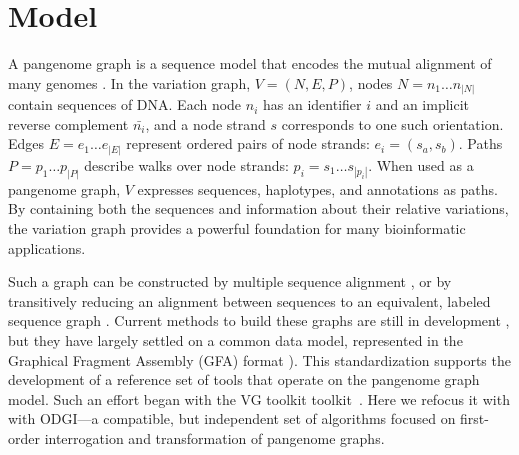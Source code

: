 \documentclass{bioinfo}
\newcommand{\red}[1]{{\textcolor{Red}{#1}}}
\newcommand{\FIXME}[1]{\red{[FIXME: #1]}}
\begin{document}

\section{Model}

A pangenome graph is a sequence model that encodes the mutual alignment of many genomes \citep{Garrison_2019_thesis,Eizenga_2020}.
In the variation graph, $V = (N, E, P)$, nodes $N = n_1\ldots n_{|N|}$ contain sequences of DNA.
Each node $n_i$ has an identifier $i$ and an implicit reverse complement $\bar{n_i}$, and a node strand $s$ corresponds to one such orientation.
Edges $E = e_1\ldots e_{|E|}$ represent ordered pairs of node strands: $e_i = ( s_a, s_b )$.
Paths $P = p_1\ldots p_{|P|}$ describe walks over node strands: $p_i = s_1 \ldots s_{|p_i|}$.
When used as a pangenome graph, $V$ expresses sequences, haplotypes, and annotations as paths.
By containing both the sequences and information about their relative variations, the variation graph provides a powerful foundation for many bioinformatic applications.

Such a graph can be constructed by multiple sequence alignment \citep{Lee_2002,Grasso_2004}, or by transitively reducing an alignment between sequences to an equivalent, labeled sequence graph \citep{Kehr_2014,Garrison_2019_thesis}.
Current methods to build these graphs are still in development \citep{Li:2020,Armstrong:2020,pggb}, but they have largely settled on a common data model, represented in the Graphical Fragment Assembly (GFA) format \citep{GFA}).
This standardization supports the development of a reference set of tools that operate on the pangenome graph model.
Such an effort began with the VG toolkit toolkit~\citep{Garrison:2018}.
Here we refocus it with with ODGI---a compatible, but independent set of algorithms focused on first-order interrogation and transformation of pangenome graphs.

\end{document}
